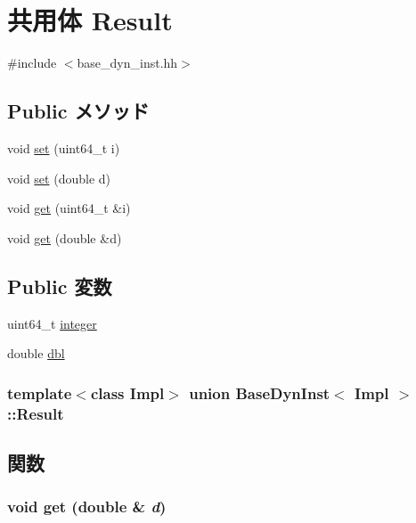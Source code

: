 \hypertarget{unionBaseDynInst_1_1Result}{
\section{共用体 Result}
\label{unionBaseDynInst_1_1Result}
}


{\ttfamily \#include $<$base\_\-dyn\_\-inst.hh$>$}\subsection*{Public メソッド}
\begin{DoxyCompactItemize}
\item 
void \hyperlink{unionBaseDynInst_1_1Result_a30a5b4d2249237f50ab1a3d705ed91ed}{set} (uint64\_\-t i)
\item 
void \hyperlink{unionBaseDynInst_1_1Result_ae0ede19c410ba9c2044cd103cdc8c6c5}{set} (double d)
\item 
void \hyperlink{unionBaseDynInst_1_1Result_a48451357be4a53c83f1bdd243df37d2a}{get} (uint64\_\-t \&i)
\item 
void \hyperlink{unionBaseDynInst_1_1Result_a47bb6359bb9f1642a6bf2b64725658ae}{get} (double \&d)
\end{DoxyCompactItemize}
\subsection*{Public 変数}
\begin{DoxyCompactItemize}
\item 
uint64\_\-t \hyperlink{unionBaseDynInst_1_1Result_a88f9f5e1216d6aaa43434facecd25bc4}{integer}
\item 
double \hyperlink{unionBaseDynInst_1_1Result_a57291299e530453fdec37a931c728239}{dbl}
\end{DoxyCompactItemize}
\subsubsection*{template$<$class Impl$>$ union BaseDynInst$<$ Impl $>$::Result}



\subsection{関数}
\hypertarget{unionBaseDynInst_1_1Result_a47bb6359bb9f1642a6bf2b64725658ae}{
\subsubsection[{get}]{\setlength{\rightskip}{0pt plus 5cm}void get (double \& {\em d})}}
\label{unionBaseDynInst_1_1Result_a47bb6359bb9f1642a6bf2b64725658ae}



